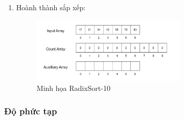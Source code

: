 \begin{enumerate}
    \item Hoành thành sắp xếp:
    \begin{figure}[H]
        \centering
        \includegraphics[width=0.7\textwidth]{img/radix_sort/10.png}
        \caption{Minh họa RadixSort-10}
    \end{figure}
\end{enumerate}

\subsubsection{Độ phức tạp}
